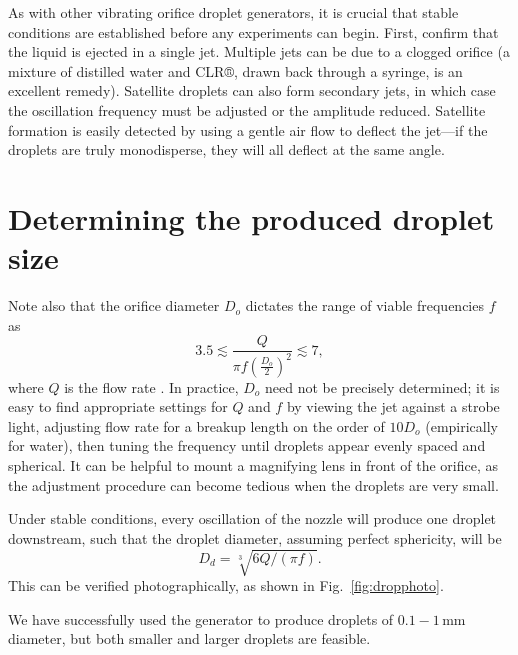 \documentclass[11.5pt,oneside]{book}
\newcommand*{\figref}[1]{Fig.~\ref{#1}}
\begin{document}
As with other vibrating orifice droplet generators, it is crucial that stable
conditions are established before any experiments can begin. First, confirm that
the liquid is ejected in a single jet. Multiple jets can be due to a clogged
orifice (a mixture of distilled water and CLR®, drawn back through a
syringe, is an excellent remedy). Satellite droplets can also form secondary
jets, in which case the oscillation frequency must be adjusted or the amplitude
reduced. Satellite formation is easily detected by using a gentle air flow to
deflect the jet---if the droplets are truly monodisperse, they will all deflect
at the same angle.\cite{Strom69}

\section{Determining the produced droplet size \label{sec:verify-droplet-size}}
Note also that the orifice diameter $D_o$ dictates the range of viable
frequencies $f$ as 
\begin{equation}
    3.5 \lesssim \frac{Q}{\pi f \left(\frac{D_o}{2}\right)^2}
\lesssim 7,
\end{equation}
where $Q$ is the flow rate \cite{Savart33, Rayleigh79}. In
practice, $D_o$ need not be
precisely determined; it is easy to find appropriate settings for $Q$
and $f$ by viewing the jet against a strobe light, adjusting flow rate for a breakup
length on the order of $10 D_o$ (empirically for water), then tuning the frequency
until droplets appear evenly spaced and spherical. It can be helpful to mount a
magnifying lens in front of the orifice, as the adjustment procedure can become
tedious when the droplets are very small.

Under stable conditions, every oscillation of the nozzle will produce one droplet
downstream, such that the droplet diameter, assuming perfect sphericity, will be 
\begin{equation}
        D_d = \sqrt[3]{6Q/(\pi f)}.\label{eq:rayl}
\end{equation}
This can be verified photographically, as shown in \figref{fig:dropphoto}.

We have successfully used the generator to produce droplets of
$0.1-1\,$mm diameter, but both smaller and larger droplets are feasible.
\end{document}
